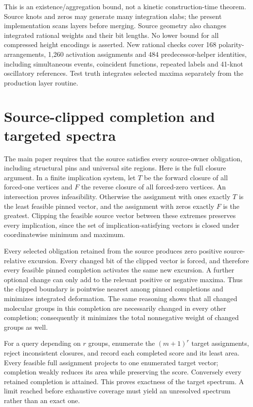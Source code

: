 \documentclass[10pt,letterpaper]{article}
\begin{document}
This is an existence/aggregation bound, not a kinetic construction-time theorem. Source knots and zeros may generate many integration slabs; the present implementation scans layers before merging. Source geometry also changes integrated rational weights and their bit lengths. No lower bound for all compressed height encodings is asserted. New rational checks cover 168 polarity-arrangements, 1,260 activation assignments and 484 predecessor-helper identities, including simultaneous events, coincident functions, repeated labels and 41-knot oscillatory references. Test truth integrates selected maxima separately from the production layer routine.

\section{Source-clipped completion and targeted spectra}
The main paper requires that the source satisfies every source-owner obligation, including structural pins and universal site regions. Here is the full closure argument. In a finite implication system, let $T$ be the forward closure of all forced-one vertices and $F$ the reverse closure of all forced-zero vertices. An intersection proves infeasibility. Otherwise the assignment with ones exactly $T$ is the least feasible pinned vector, and the assignment with zeros exactly $F$ is the greatest. Clipping the feasible source vector between these extremes preserves every implication, since the set of implication-satisfying vectors is closed under coordinatewise minimum and maximum.

Every selected obligation retained from the source produces zero positive source-relative excursion. Every changed bit of the clipped vector is forced, and therefore every feasible pinned completion activates the same new excursion. A further optional change can only add to the relevant positive or negative maxima. Thus the clipped boundary is pointwise nearest among pinned completions and minimizes integrated deformation. The same reasoning shows that all changed molecular groups in this completion are necessarily changed in every other completion; consequently it minimizes the total nonnegative weight of changed groups as well.

For a query depending on $r$ groups, enumerate the $(m+1)^r$ target assignments, reject inconsistent closures, and record each completed score and its least area. Every feasible full assignment projects to one enumerated target vector; completion weakly reduces its area while preserving the score. Conversely every retained completion is attained. This proves exactness of the target spectrum. A limit reached before exhaustive coverage must yield an unresolved spectrum rather than an exact one.
\end{document}

